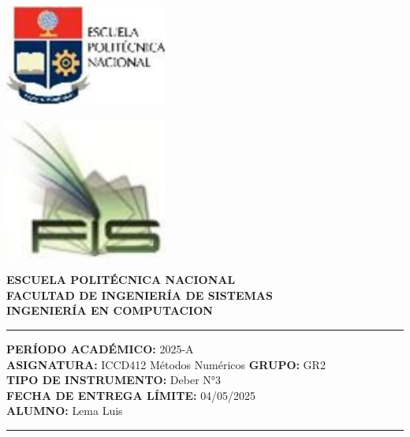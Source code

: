 \documentclass[12pt]{article}
\begin{document}
\begin{minipage}{0.45\textwidth}
    \includegraphics[width=0.4\textwidth]{inFiles/Figures/epnLogo.jpg}
\end{minipage}
\hfill
\begin{minipage}{0.45\textwidth}
    \raggedleft
    \includegraphics[width=0.4\textwidth]{inFiles/Figures/FIS_logo.jpg}
\end{minipage}

\vspace{0.5cm}

\begin{center}
    \textbf{ESCUELA POLITÉCNICA NACIONAL}\\[0.2cm]
    \textbf{FACULTAD DE INGENIERÍA DE SISTEMAS}\\[0.2cm]
    \textbf{INGENIERÍA {\textbf{EN COMPUTACION}}}
\end{center}

\vspace{0.5cm}
\hrule
\vspace{0.5cm}

\noindent\textbf{PERÍODO ACADÉMICO:} 2025-A\\[0.2cm]
\noindent\textbf{ASIGNATURA:} ICCD412 Métodos Numéricos \hfill \textbf{GRUPO:} GR2\\[0.2cm]
\noindent\textbf{TIPO DE INSTRUMENTO:} {Deber N°3}\\[0.2cm]
\noindent\textbf{FECHA DE ENTREGA LÍMITE:} {04/05/2025}\\[0.2cm]
\noindent\textbf{ALUMNO:} {Lema Luis}

\vspace{0.5cm}
\hrule
\vspace{1cm}
\end{document}
